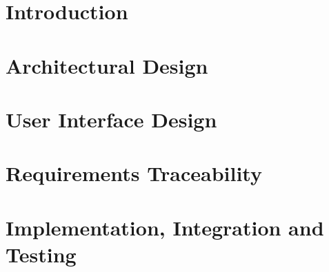 \documentclass[11pt,twoside]{article}
\begin{document}
\setcounter{page}{2}


\newpage
{}
\tableofcontents
\newpage
{}
\listoffigures
{}
\listoftables

\clearpage
\section{Introduction}\label{sect:introduction}


\clearpage
\section{Architectural Design}\label{sect:architecture}


\clearpage
\section{User Interface Design}\label{sect:userinterface}


\clearpage
\section{Requirements Traceability}\label{sect:traceability}


\clearpage
\section{Implementation, Integration and Testing}\label{sect:implementation}

\end{document}
